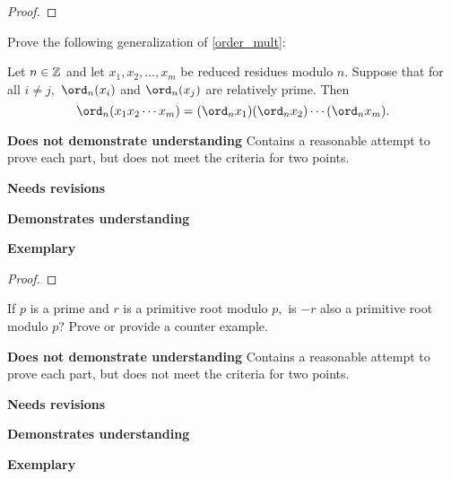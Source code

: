 \documentclass[letterpaper, 11pt]{../ximera}
\begin{document}
\begin{proof}
 
\end{proof}

\begin{ex}
    Prove the following generalization of \ref{order_mult}:
    
    
    \begin{lem*}
        Let $n\in\mathbb Z$ and let $x_1,x_2,\dots,x_m$ be reduced residues modulo $n$.  Suppose that for all $i\neq j,$ $\ord_n(x_i)$ and $\ord_n(x_j)$ are relatively prime. Then \[\ord_n(x_1 x_2\cdots x_m)=(\ord_n x_1)(\ord_n x_2)\cdots (\ord_n x_m).\]
    \end{lem*}
\end{ex}

\begin{writeRubric}
    \item \textbf{Does not demonstrate understanding}
     Contains a reasonable attempt to prove each part, but does not meet the criteria for two points.
    \item \textbf{Needs revisions}
     
    \item \textbf{Demonstrates understanding}
    
    \item \textbf{Exemplary}
        
\end{writeRubric}
                                       
\begin{proof}
 
\end{proof}

\begin{ex}
	If $p$ is a prime and $r$ is a primitive root modulo $p,$ is $-r$ also a primitive root modulo $p$? Prove or provide a counter example.
\end{ex}

\begin{writeRubric}
    \item \textbf{Does not demonstrate understanding}
     Contains a reasonable attempt to prove each part, but does not meet the criteria for two points.
    \item \textbf{Needs revisions}
     
    \item \textbf{Demonstrates understanding}
    
    \item \textbf{Exemplary}
        
\end{writeRubric}
                                       
\end{document}
